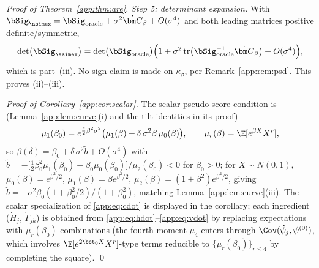 \begin{proof}[Proof of Theorem~\ref{app:thm:are}]
\emph{Step 5: determinant expansion.} With
$\bSig_{\asimex}=\bSig_{\mathrm{oracle}}+\sigma^2\dot{\bm C}_\beta
+O(\sigma^4)$ and both leading matrices positive definite/symmetric,
\[
  \det\bigl(\bSig_{\asimex}\bigr)
  =\det\bigl(\bSig_{\mathrm{oracle}}\bigr)
   \Bigl(1+\sigma^2\operatorname{tr}\bigl(
     \bSig_{\mathrm{oracle}}^{-1}\dot{\bm C}_\beta\bigr)
   +O(\sigma^4)\Bigr),
\]
which is part~(iii). No sign claim is made on
$\kappa_\beta$, per Remark~\ref{app:rem:psd}. This proves (ii)--(iii).

\emph{Proof of Corollary~\ref{app:cor:scalar}.} The scalar pseudo-score
condition is (Lemma~\ref{app:lem:curve}(i) and the tilt identities in its
proof)
\[
  \mu_1(\beta_0)=e^{\frac{\delta}{2}\beta^2\sigma^2}
  \bigl(\mu_1(\beta)+\delta\,\sigma^2\beta\,\mu_0(\beta)\bigr),
  \qquad \mu_r(\beta)=\E[e^{\beta X}X^r],
\]
so $\beta(\delta)=\beta_0+\delta\,\sigma^2\tilde b+O(\sigma^4)$ with
$\tilde b=-\bigl[\tfrac12\beta_0^{2}\mu_1(\beta_0)
+\beta_0\mu_0(\beta_0)\bigr]/\mu_2(\beta_0)<0$ for $\beta_0>0$; for
$X\sim N(0,1)$, $\mu_0(\beta)=e^{\beta^2/2}$,
$\mu_1(\beta)=\beta e^{\beta^2/2}$,
$\mu_2(\beta)=(1+\beta^2)e^{\beta^2/2}$, giving
$\tilde b=-\sigma^2\beta_0(1+\beta_0^2/2)/(1+\beta_0^2)$, matching
Lemma~\ref{app:lem:curve}(iii). The scalar specialization of
\eqref{app:eq:cdot} is displayed in the corollary; each ingredient
($\dot H_j$, $\dot\Gamma_{jk}$) is obtained from
\eqref{app:eq:hdot}--\eqref{app:eq:vdot} by replacing expectations with
$\mu_r(\beta_0)$-combinations (the fourth moment $\mu_4$ enters through
$\Cov(\dot\psi_j,\psi^{(0)})$, which involves
$\E[e^{2\bet_0X}X^r]$-type terms reducible to $\{\mu_r(\beta_0)\}_{r\le4}$
by completing the square). \qed
\end{proof}

